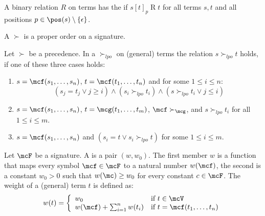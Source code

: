 
\begin{definition}
	A binary relation $R$ on terms has the  if
	$s[t]_p\mathbin{R}t$ for all terms $s,t$ and all positions $p\in\pos(s) \setminus \{\epsilon\}$.
\end{definition}

\begin{definition}\label{def:prec}
	A  $\succ$ is a proper order
	on a signature.
\end{definition}

\begin{definition}[LPO]\label{def:lpo}
	Let $\succ$ be a precedence. In a  $\succ_{lpo}$ on (general) terms the relation $s\succ_{lpo} t$ holds,
	if one of these three cases holds:
	\begin{enumerate}
		\item $s=\mcf(s_1,\ldots,s_n)$, $t=\mcf(t_1,\ldots,t_n)$ and for some $1\leq i\leq n$:
		\[
		(s_j=t_j\lor j\geq i) \land (s_i\succ_{lpo} t_i) \land (s\succ_{lpo} t_i \lor j\leq i)
		\]
		\item $s=\mcf(s_1,\ldots,s_n)$, $t=\mcg(t_1,\ldots,t_m)$, $\mcf\succ_\mcg$, and $s\succ_{lpo} t_i$ for all $1\leq i\leq m$.
		\item $s=\mcf(s_1,\ldots,s_n)$ and $(s_i=t \lor s_i\succ_{lpo} t)$ for some $1\leq i\leq m$.
	\end{enumerate}
\end{definition}

\begin{definition}\label{def:weight}
	Let $\mcF$ be a signature.
	A  is a pair $(w,w_0)$.
	The first member $w$ is a function that maps every symbol $\mcf\in\mcF$ to a natural number $w(\mcf)$,
	the second is a constant $w_0>0$ such that $w(\mc)\geq w_0$ for every constant $c\in\mcF$.
	The weight of a (general) term $t$ is defined as:
	\begin{gather*}
	w(t) = \left\{ \begin{array}{ll}
	w_0 & \text{if } t\in\mcV\\
	w(\mcf)+\sum_{i=1}^n w(t_i) & \text{if }t=\mcf(t_1,\ldots,t_n)
	\end{array}\right.
	\end{gather*}
\end{definition}

